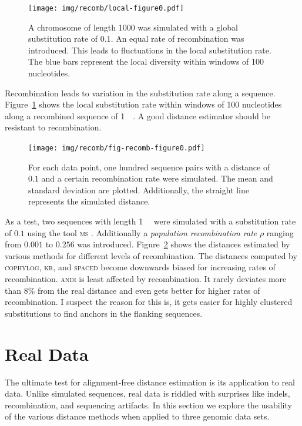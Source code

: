 \documentclass[a4paper,
  10pt,
  english,
  DIV=12,
  BCOR=8mm]{scrbook}
\newcommand{\algo}[1]{\textsc{{#1}}}
\newcommand{\andi}{\algo{andi} }
\begin{document}
\begin{figure}
  \centering
  \texttt{[image: img/recomb/local-figure0.pdf]}
  \caption[Local Diversity]{\label{fig:local}A chromosome of length 1000 was simulated with a global substitution rate of $0.1$. An equal rate of recombination was introduced. This leads to fluctuations in the local substitution rate. The blue bars represent the local diversity within windows of 100 nucleotides.}
\end{figure}

Recombination leads to variation in the substitution rate along a sequence. Figure~\ref{fig:local} shows the local substitution rate within windows of 100 nucleotides along a recombined sequence of \SI{1}{\kilo\basepairs}. A good distance estimator should be resistant to recombination.

\begin{figure}
  \centering
  \texttt{[image: img/recomb/fig-recomb-figure0.pdf]}
  \caption[Recombination Characteristics]{\label{fig:recomb} For each data point, one hundred sequence pairs with a distance of $0.1$ and a certain recombination rate were simulated. The mean and standard deviation are plotted. Additionally, the straight line represents the simulated distance.}
\end{figure}

As a test, two sequences with length \SI{1}{\mega\basepairs} were simulated with a substitution rate of $0.1$ using the tool \algo{ms} \cite{ms}. Additionally a \emph{population recombination rate} $\rho$ ranging from $0.001$ to $0.256$ was introduced. Figure~\ref{fig:recomb} shows the  distances estimated by various methods for different levels of recombination. The distances computed by \algo{cophylog}, \algo{kr}, and \algo{spaced} become downwards biased for increasing rates of recombination. \andi is least affected by recombination. It rarely deviates more than 8\% from the real distance and even gets better for higher rates of recombination. I suspect the reason for this is, it gets easier for highly clustered substitutions to find anchors in the flanking sequences. %


\section{Real Data}\label{sec:real}

The ultimate test for alignment-free distance estimation is its application to real data. Unlike simulated sequences, real data is riddled with surprises like indels, recombination, and sequencing artifacts. In this section we explore the usability of the various distance methods when applied to three genomic data sets.
\end{document}
